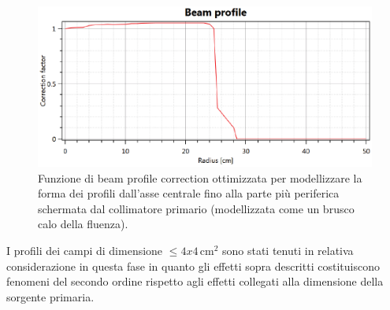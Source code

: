 \begin{figure}
\centering
\includegraphics[width=.9\textwidth]{./cap2/Ray_beamprof.png}
\caption{Funzione di beam profile correction ottimizzata per modellizzare la forma dei profili dall'asse centrale fino alla parte più periferica schermata dal collimatore primario (modellizzata come un brusco calo della fluenza).}
\label{fig:Ray_beamprof}
\end{figure}

I profili dei campi di dimensione $\leq 4x4\,$cm$^2$ sono stati tenuti in relativa considerazione in questa fase in quanto gli effetti sopra descritti costituiscono fenomeni del secondo ordine rispetto agli effetti collegati alla dimensione della sorgente primaria.

